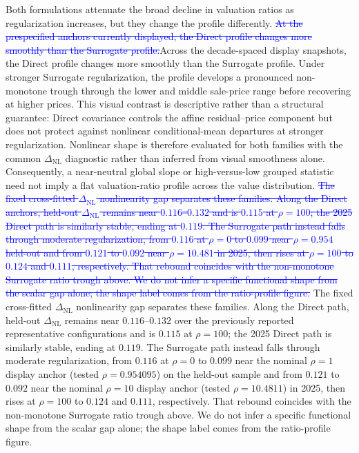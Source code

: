 \documentclass[10pt]{article}
\theoremstyle{definition}
\newcommand{\1}{\mathbf{1}}
\newcommand{\oldtext}[1]{\textcolor{blue}{\sout{#1}}}
\newcommand{\newtext}[1]{\textcolor{impGreen}{#1}}
\newcommand{\latesttext}[1]{\textcolor{latestPurple}{#1}}
\begin{document}
Both formulations attenuate the broad decline in valuation ratios as regularization
increases, but they change the profile differently. 
\oldtext{At the prespecified anchors currently displayed, the Direct profile changes more smoothly than the Surrogate profile.}\latesttext{Across the decade-spaced display snapshots, the Direct profile changes more smoothly than the Surrogate profile.} Under stronger Surrogate regularization, the profile
develops a pronounced non-monotone trough through the lower and middle sale-price
range before recovering at higher prices. \newtext{This visual contrast is descriptive rather than a structural guarantee: Direct covariance controls the affine residual--price component but does not protect against nonlinear conditional-mean departures at stronger regularization. Nonlinear shape is therefore evaluated for both families with the common $\Delta_{\mathrm{NL}}$ diagnostic rather than inferred from visual smoothness alone.} 
\newtext{Consequently, a near-neutral global slope or high-versus-low grouped statistic need not imply a flat valuation-ratio profile across the value distribution.}
\oldtext{The fixed cross-fitted $\Delta_{\mathrm{NL}}$ nonlinearity gap separates these families. Along the Direct anchors, held-out $\Delta_{\mathrm{NL}}$ remains near $0.116$--$0.132$ and is $0.115$ at $\rho=100$; the 2025 Direct path is similarly stable, ending at $0.119$. The Surrogate path instead falls through moderate regularization, from $0.116$ at $\rho=0$ to $0.099$ near $\rho=0.954$ held-out and from $0.121$ to $0.092$ near $\rho=10.481$ in 2025, then rises at $\rho=100$ to $0.124$ and $0.111$, respectively. That rebound coincides with the non-monotone Surrogate ratio trough above. We do not infer a specific functional shape from the scalar gap alone; the shape label comes from the ratio-profile figure.}
\latesttext{The fixed cross-fitted $\Delta_{\mathrm{NL}}$ nonlinearity gap separates these families. Along the Direct path, held-out $\Delta_{\mathrm{NL}}$ remains near $0.116$--$0.132$ over the previously reported representative configurations and is $0.115$ at $\rho=100$; the 2025 Direct path is similarly stable, ending at $0.119$. The Surrogate path instead falls through moderate regularization, from $0.116$ at $\rho=0$ to $0.099$ near the nominal $\rho=1$ display anchor (tested $\rho=0.954095$) on the held-out sample and from $0.121$ to $0.092$ near the nominal $\rho=10$ display anchor (tested $\rho=10.4811$) in 2025, then rises at $\rho=100$ to $0.124$ and $0.111$, respectively. That rebound coincides with the non-monotone Surrogate ratio trough above. We do not infer a specific functional shape from the scalar gap alone; the shape label comes from the ratio-profile figure.}
\end{document}
